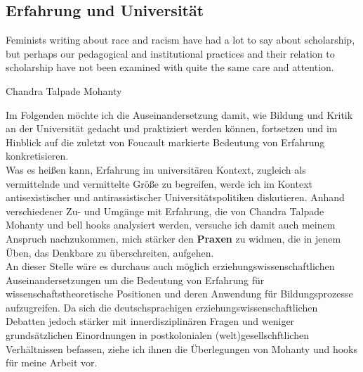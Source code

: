 \subsection{Erfahrung und Universität}
\epigraph{ 
 Feminists writing about race and racism have had a lot to 
say about scholarship, but perhaps our pedagogical and institutional practices and their relation to scholarship have not been examined with quite the same care and attention. 
  }{Chandra Talpade Mohanty\footnotemark}  

Im Folgenden möchte ich die Auseinandersetzung damit, wie Bildung und Kritik
an der Universität gedacht und praktiziert werden können, fortsetzen und im
Hinblick auf die zuletzt von Foucault markierte Bedeutung von Erfahrung
konkretisieren.\\
Was es heißen kann, Erfahrung im universitären Kontext, zugleich als
vermittelnde und vermittelte Größe zu begreifen, werde ich im Kontext
antisexistischer und antirassistischer Universitätspolitiken diskutieren.
Anhand verschiedener Zu- und Umgänge mit Erfahrung, die von Chandra Talpade
Mohanty und bell hooks analysiert werden, versuche ich damit auch meinem
Anspruch nachzukommen, mich stärker den \textbf{Praxen} zu widmen, die in jenem Üben,
das Denkbare zu überschreiten, aufgehen.\\
An dieser Stelle wäre es durchaus auch
möglich  erziehungswissenschaftlichen Auseinandersetzungen um die Bedeutung von
Erfahrung für wissenschaftstheoretische Positionen und deren Anwendung für
Bildungsprozesse  aufzugreifen. Da sich die deutschsprachigen
erziehungswissenschaftlichen Debatten\footnotemark {} jedoch stärker mit innerdisziplinären Fragen und
weniger grundsätzlichen Einordnungen in postkolonialen (welt)gesellschftlichen
Verhältnissen befassen, ziehe ich ihnen die Überlegungen von  Mohanty und hooks
für meine Arbeit vor.\\

